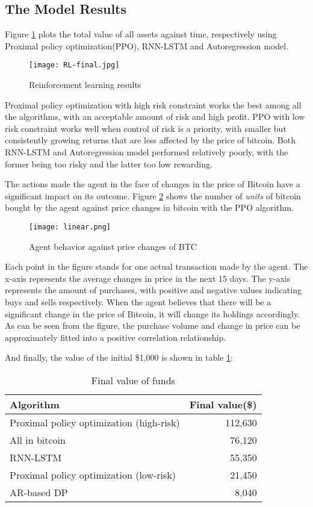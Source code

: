 \documentclass{mcmthesis}
\begin{document}
\subsection{The Model Results}

Figure \ref{RL-Results}  plots the total value of all assets against time,
respectively using Proximal policy optimization(PPO), RNN-LSTM and Autoregression model.

\begin{figure}[h]
  \small
  \centering
  \texttt{[image: RL-final.jpg]}
  \caption{Reinforcement learning results} \label{RL-Results}
\end{figure}

Proximal policy optimization with high risk constraint works the best among all the algorithms, with an acceptable amount of risk and high profit. PPO with low risk constraint works well when control of risk is a priority, with smaller but consistently growing returns that are less affected by the price of bitcoin. Both RNN-LSTM and Autoregression model performed relatively poorly, with the former being too risky and the latter too low rewarding.

The actions made the agent in the face of changes in the price of Bitcoin have a significant impact on its outcome.
Figure \ref{BTC} shows the number of \textit{units} of bitcoin bought by the agent against price changes in bitcoin with the PPO algorithm.

\begin{figure}[h]
  \small
  \centering
  \texttt{[image: linear.png]}
  \caption{Agent behavior against price changes of BTC} \label{BTC}
\end{figure}

Each point in the figure stands for one actual transaction made by the agent.
The x-axis represents the average changes in price in the next 15 days.
The y-axis represents the amount of purchases, with positive and negative values indicating buys and sells respectively.
When the agent believes that there will be a significant change in the price of Bitcoin, it will change its holdings accordingly.
As can be seen from the figure, the purchase volume and change in price can be approximately fitted into a positive correlation relationship.

And finally, the value of the initial \$1,000 is shown in table \ref{final-value}:

\begin{table}[H]
  \centering
  \begin{tabular}{@{}lr@{}}
    \toprule
    Algorithm & Final value(\$) \\
    \midrule
    Proximal policy optimization (high-risk) & 112,630 \\
    {\color{gray} All in bitcoin} & {\color{gray} 76,120} \\
    RNN-LSTM & 55,350 \\
    Proximal policy optimization (low-risk) & 21,450 \\
    AR-based DP & 8,040 \\
    \bottomrule
  \end{tabular}
  \caption{Final value of funds}
  \label{final-value}
\end{table}
\end{document}
